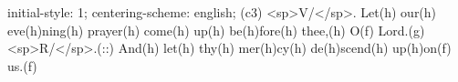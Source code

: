 initial-style: 1;
centering-scheme: english;
(c3) <sp>V/</sp>. Let(h) our(h) eve(h)ning(h) prayer(h) come(h) up(h) be(h)fore(h) thee,(h) O(f) Lord.(g) <sp>R/</sp>.(::) And(h) let(h) thy(h) mer(h)cy(h) de(h)scend(h) up(h)on(f) us.(f)
